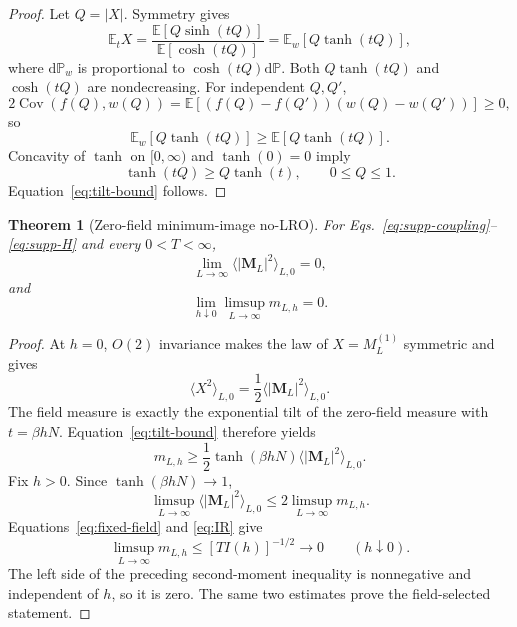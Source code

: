 \documentclass[aps,prb,preprint,notitlepage,groupedaddress,amsmath,amssymb,
               superscriptaddress,nofootinbib,floatfix]{revtex4-2}
\theoremstyle{definition}
\theoremstyle{plain}
\newtheorem{theorem}{Theorem}
\newcommand{\dd}{\mathrm{d}}
\begin{document}
\begin{proof}
Let $Q=|X|$.  Symmetry gives
\begin{equation}
 \mathbb E_tX
 =\frac{\mathbb E[Q\sinh(tQ)]}{\mathbb E[\cosh(tQ)]}
 =\mathbb E_w[Q\tanh(tQ)],
\end{equation}
where $\dd\mathbb P_w$ is proportional to
$\cosh(tQ)\dd\mathbb P$.  Both $Q\tanh(tQ)$ and $\cosh(tQ)$ are
nondecreasing.  For independent $Q,Q'$,
\begin{equation}
 2\operatorname{Cov}(f(Q),w(Q))
 =\mathbb E[(f(Q)-f(Q'))(w(Q)-w(Q'))]\ge0,
\end{equation}
so
\begin{equation}
 \mathbb E_w[Q\tanh(tQ)]\ge\mathbb E[Q\tanh(tQ)].
\end{equation}
Concavity of $\tanh$ on $[0,\infty)$ and $\tanh(0)=0$ imply
\begin{equation}
 \tanh(tQ)\ge Q\tanh(t),\qquad0\le Q\le1.
\end{equation}
Equation~\eqref{eq:tilt-bound} follows.
\end{proof}

\begin{theorem}[Zero-field minimum-image no-LRO]
For Eqs.~\eqref{eq:supp-coupling}--\eqref{eq:supp-H} and every
$0<T<\infty$,
\begin{equation}
 \boxed{\displaystyle
 \lim_{L\to\infty}
 \langle|\bm M_L|^2\rangle_{L,0}=0,}
 \label{eq:main-result}
\end{equation}
and
\begin{equation}
 \boxed{\displaystyle
 \lim_{h\downarrow0}
 \limsup_{L\to\infty}m_{L,h}=0.}
\end{equation}
\end{theorem}

\begin{proof}
At $h=0$, $O(2)$ invariance makes the law of
$X=M_L^{(1)}$ symmetric and gives
\begin{equation}
 \langle X^2\rangle_{L,0}
 =\frac12\langle|\bm M_L|^2\rangle_{L,0}.
\end{equation}
The field measure is exactly the exponential tilt of the zero-field measure
with $t=\beta hN$.  Equation~\eqref{eq:tilt-bound} therefore yields
\begin{equation}
 m_{L,h}\ge
 \frac12\tanh(\beta hN)
 \langle|\bm M_L|^2\rangle_{L,0}.
 \label{eq:finite-bridge}
\end{equation}
Fix $h>0$.  Since $\tanh(\beta hN)\to1$,
\begin{equation}
 \limsup_{L\to\infty}
 \langle|\bm M_L|^2\rangle_{L,0}
 \le2\limsup_{L\to\infty}m_{L,h}.
\end{equation}
Equations~\eqref{eq:fixed-field} and \eqref{eq:IR} give
\begin{equation}
 \limsup_{L\to\infty}m_{L,h}
 \le[TI(h)]^{-1/2}\longrightarrow0
 \qquad(h\downarrow0).
\end{equation}
The left side of the preceding second-moment inequality is nonnegative and
independent of $h$, so it is zero.  The same two estimates prove the
field-selected statement.
\end{proof}
\end{document}
